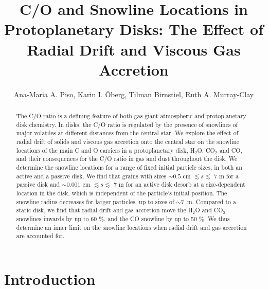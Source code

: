 \documentclass[apj]{emulateapj}
\begin{document}


\title{C/O and Snowline Locations in Protoplanetary Disks: The Effect of Radial Drift and Viscous Gas Accretion}

\author{Ana-Maria A. Piso, Karin I. \"Oberg, Tilman Birnstiel, Ruth A. Murray-Clay}


\begin{abstract}
The C/O ratio is a defining feature of both gas giant atmospheric and protoplanetary disk chemistry. In disks, the C/O ratio is regulated by the presence of snowlines of major volatiles at different distances from the central star.
We explore the effect of radial drift of solids and viscous gas accretion onto the central star on the snowline locations of the main C and O carriers in a protoplanetary disk, H$_2$O, CO$_2$ and CO, and their consequences for the C/O ratio in gas and dust throughout the disk. We determine the snowline locations for a range of fixed initial particle sizes, in both an active and a passive disk. We find that grains with sizes $\sim$$0.5$ cm $\lesssim s \lesssim$ 7 m for a passive disk and $\sim$$0.001$ cm $\lesssim s \lesssim$ 7 m for an active disk desorb %
at a %
size-dependent location in the disk, which is independent %
of the particle's initial position. The snowline radius decreases for larger particles, up to sizes of $\sim$7~m. %
Compared to a static disk, we find that radial drift and gas accretion move the H$_2$O and CO$_2$ snowlines inwards by up to 60 \%, and the CO snowline by up to 50 \%. We thus determine an inner limit on the snowline locations when radial drift and gas accretion are accounted for. %
\end{abstract}

\section{Introduction}
\end{document}
